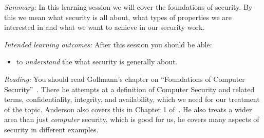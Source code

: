 \mode*


\emph{Summary:}
In this learning session we will cover the foundations of security.
By this we mean what security is all about, \eg what types of properties we are 
interested in and what we want to achieve in our security work.

\emph{Intended learning outcomes:}
After this session you should be able:
\begin{itemize}
  \item to \emph{understand} the what security is generally about.
\end{itemize}


\emph{Reading:}
You should read Gollmann's chapter on \enquote{Foundations of Computer 
  Security}~\cite[Chap.\ 3]{Gollmann2011cs}.
There he attempts at a definition of Computer Security and related terms, \eg 
confidentiality, integrity, and availability, which we need for our treatment of 
the topic.
Anderson also covers this in Chapter 1 of~\cite{Anderson2008sea}.
He also treats a wider area than just \emph{computer} security, which is good 
for us, he covers many aspects of security in different examples.

